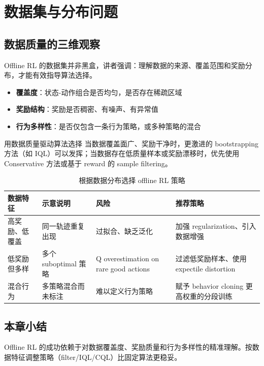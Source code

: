 \section{数据集与分布问题}

\subsection{数据质量的三维观察}

Offline RL 的数据集并非黑盒，讲者强调：理解数据的来源、覆盖范围和奖励分布，才能有效指导算法选择。

\begin{itemize}
    \item \textbf{覆盖度}：状态-动作组合是否均匀，是否存在稀疏区域
    \item \textbf{奖励结构}：奖励是否稠密、有噪声、有异常值
    \item \textbf{行为多样性}：是否仅包含一条行为策略，或多种策略的混合
\end{itemize}

\begin{importantbox}{用数据质量驱动算法选择}
当数据覆盖面广、奖励干净时，更激进的 bootstrapping 方法（如 IQL）可以发挥；当数据存在低质量样本或奖励漂移时，优先使用 Conservative 方法或基于 reward 的 sample filtering。
\end{importantbox}

\begin{table}[H]
\centering
\begin{tabular}{p{} p{} p{} p{}}
\toprule
数据特征 & 示意说明 & 风险 & 推荐策略 \\
\midrule
高奖励、低覆盖 & 同一轨迹重复出现 & 过拟合、缺乏泛化 & 加强 regularization、引入数据增强 \\
低奖励但多样 & 多个 suboptimal 策略 & Q overestimation on rare good actions & 过滤低奖励样本、使用 expectile distortion \\
混合行为 & 多策略混合而未标注 & 难以定义行为策略 & 赋予 behavior cloning 更高权重的分段训练 \\
\bottomrule
\end{tabular}
\caption{根据数据分布选择 offline RL 策略}
\end{table}

\subsection{本章小结}

Offline RL 的成功依赖于对数据覆盖度、奖励质量和行为多样性的精准理解。按数据特征调整策略（filter/IQL/CQL）比固定算法更稳妥。


